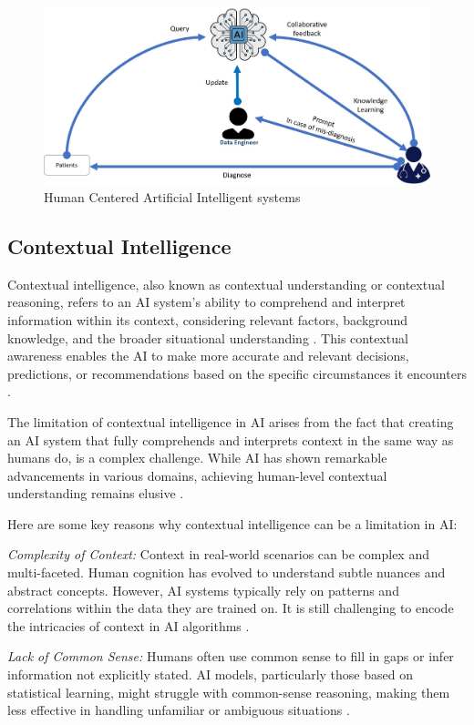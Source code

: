 \documentclass{article}
\begin{document}
\begin{figure}
\centering
\includegraphics[width=0.85\linewidth]{Fig1.5.jpg}
\caption{\label{fig:1.5}Human Centered Artificial Intelligent systems}
\end{figure}


\subsection{Contextual Intelligence}

Contextual intelligence, also known as contextual understanding or contextual reasoning, refers to an AI system's ability to comprehend and interpret information within its context, considering relevant factors, background knowledge, and the broader situational understanding \cite{seabolt2018contextual}. This contextual awareness enables the AI to make more accurate and relevant decisions, predictions, or recommendations based on the specific circumstances it encounters \cite{dellermann2019hybrid}.

The limitation of contextual intelligence in AI arises from the fact that creating an AI system that fully comprehends and interprets context in the same way as humans do, is a complex challenge. While AI has shown remarkable advancements in various domains, achieving human-level contextual understanding remains elusive \cite{papyshev2022limitation}.

Here are some key reasons why contextual intelligence can be a limitation in AI:

\emph{Complexity of Context:} Context in real-world scenarios can be complex and multi-faceted. Human cognition has evolved to understand subtle nuances and abstract concepts. However, AI systems typically rely on patterns and correlations within the data they are trained on. It is still challenging to encode  the intricacies of context in AI algorithms \cite{jagarlamudi2022requirements}.

\emph{Lack of Common Sense:} Humans often use common sense to fill in gaps or infer information not explicitly stated. AI models, particularly those based on statistical learning, might struggle with common-sense reasoning, making them less effective in handling unfamiliar or ambiguous situations \cite{mccarthy1987generality}.
\end{document}
